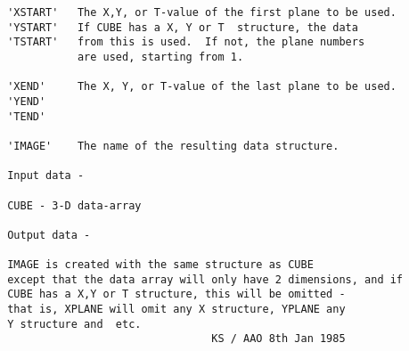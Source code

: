 \begin{description}
\begin{verbatim}
 'XSTART'   The X,Y, or T-value of the first plane to be used.
 'YSTART'   If CUBE has a X, Y or T  structure, the data
 'TSTART'   from this is used.  If not, the plane numbers
            are used, starting from 1.

 'XEND'     The X, Y, or T-value of the last plane to be used.
 'YEND'
 'TEND'

 'IMAGE'    The name of the resulting data structure.

 Input data -

 CUBE - 3-D data-array

 Output data -

 IMAGE is created with the same structure as CUBE
 except that the data array will only have 2 dimensions, and if
 CUBE has a X,Y or T structure, this will be omitted -
 that is, XPLANE will omit any X structure, YPLANE any
 Y structure and  etc.
                                 KS / AAO 8th Jan 1985
\end{verbatim}
\end{description}
